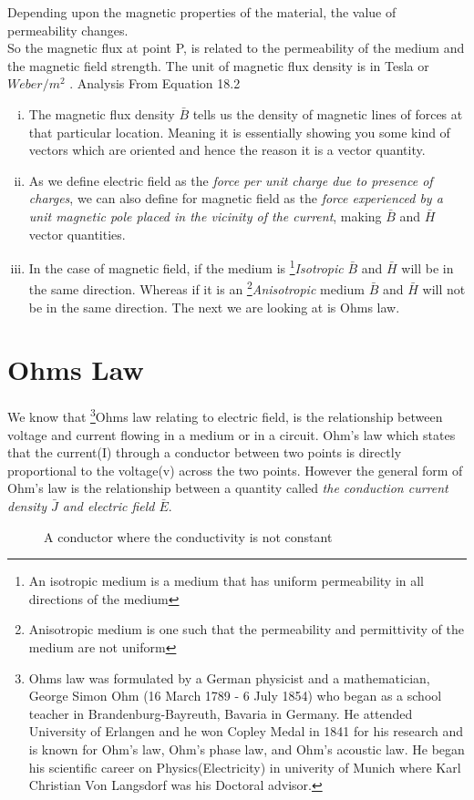 Depending upon the magnetic properties of the material, the value of permeability changes. \\
So the magnetic flux at point P, is related to the permeability of the medium and the magnetic field strength. The unit of magnetic flux density is in Tesla or $Weber/m^{2}$ . Analysis From Equation 18.2
\begin{enumerate}[(i)]
\item The magnetic flux density $\bar{B}$ tells us the density of magnetic lines of forces at that particular location. Meaning it is essentially showing you some kind of vectors which are oriented and hence the reason it is a vector quantity.
\item As we define electric field as the  \emph{force per unit charge due to presence of charges}, we can also define for magnetic field as the \emph{force experienced by a unit magnetic pole placed in the vicinity of the current}, making $\bar{B}$ and $\bar{H}$ vector quantities.
\item In the case of magnetic field, if the medium is \footnote[2]{An isotropic medium is a medium that has uniform permeability in all directions of the medium }\emph{Isotropic} $\bar{B}$ and $\bar{H}$ will be in the same direction. Whereas if it is an \footnote[3]{Anisotropic medium is one such that the permeability and permittivity of the medium are not uniform }\emph{Anisotropic} medium $\bar{B}$ and $\bar{H}$ will not be in the same direction. The next we are looking at is Ohms law.
\end{enumerate}

\section{Ohms Law} 
We know that \footnote[4]{Ohms law was formulated by a German physicist and a mathematician, George Simon Ohm (16 March 1789 - 6 July 1854) who began as a school teacher in Brandenburg-Bayreuth, Bavaria in Germany. He attended University of Erlangen and he won Copley Medal in 1841 for his research and is known for Ohm's law, Ohm's phase law, and Ohm's acoustic law. He began his scientific career on Physics(Electricity) in univerity of Munich where Karl Christian Von Langsdorf was his Doctoral advisor.}Ohms law relating to electric field, is the relationship between voltage and current flowing in a medium or in a circuit. Ohm's law which states that the current(I) through a conductor between two points is directly proportional to the voltage(v) across the two points. However the general form of Ohm's law is the relationship between a quantity called \emph{the conduction current density $ \bar{J} $ and electric field $ \bar{E} $}.
\begin{figure}
\centering
\caption{A conductor where the conductivity is not constant}
\label{}
\end{figure}

